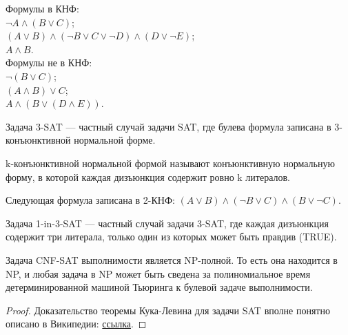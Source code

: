     \begin{Example}
        Формулы в КНФ:\\
        $\neg A\wedge (B\vee C)$;\\
        $(A\vee B)\wedge (\neg B\vee C\vee \neg D)\wedge (D\vee \neg E)$;\\
        $A\wedge B$.\\
        Формулы не в КНФ:\\
        $\neg (B\vee C)$;\\
        $(A\wedge B)\vee C$;\\
        $A\wedge (B\vee (D\wedge E))$.
    \end{Example}
    
    \begin{Def}
        Задача 3-SAT --- частный случай задачи SAT, где булева формула записана в 3-конъюнктивной нормальной форме.
    \end{Def}
    
    \begin{Def}[k-КНФ]
        k-конъюнктивной нормальной формой называют конъюнктивную нормальную форму, в которой каждая дизъюнкция содержит ровно k литералов.
    \end{Def}
    
    \begin{Example}
        Следующая формула записана в 2-КНФ:
        $(A\lor B)\land (\neg B\lor C)\land (B\lor \neg C)$.
    \end{Example}
    
    \begin{Def}
        Задача 1-in-3-SAT --- частный случай задачи 3-SAT, где каждая дизъюнкция содержит три литерала, только один из которых может быть правдив (TRUE).
    \end{Def}
    
    \begin{Thm}
        Задача CNF-SAT выполнимости является NP-полной. То есть она находится в NP, и любая задача в NP может быть сведена за полиномиальное время детерминированной машиной Тьюринга к булевой задаче выполнимости.
    \end{Thm}
    
    \begin{proof}
        Доказательство теоремы Кука-Левина для задачи SAT вполне понятно описано в Википедии: 
        \href{https://en.wikipedia.org/wiki/Cook%E2%80%93Levin_theorem}{ссылка}. 
    \end{proof}

